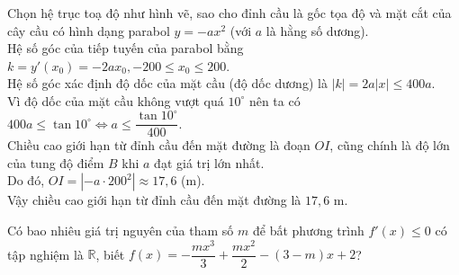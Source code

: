 \begin{bt}
{Chọn hệ trục toạ độ như hình vẽ, sao cho đỉnh cầu là gốc tọa độ và mặt cắt của cây cầu có hình dạng parabol $y=-a x^2$ (với $a$ là hằng số dương).\\
Hệ số góc của tiếp tuyến của parabol bằng $k=y'(x_0)=-2 a x_0,-200 \leq x_0 \leq 200$.\\
Hệ số góc xác định độ dốc của mặt cầu (độ dốc dương) là $|k|=2 a|x| \leq 400 a$.\\
Vì độ dốc của mặt cầu không vượt quá $10^\circ$ nên ta có
$400 a \leq \tan 10^\circ \Leftrightarrow a \leq \dfrac{\tan 10^\circ}{400}$.\\
Chiều cao giới hạn từ đỉnh cầu đến mặt đường là đoạn $O I$, cũng chính là độ lớn của tung độ điểm $B$ khi $a$ đạt giá trị lớn nhất.\\
Do đó, $O I=\left|-a \cdot 200^2\right|\approx 17{,}6$ (m).\\
Vậy chiều cao giới hạn từ đỉnh cầu đến mặt đường là $17{,}6$ m.
}
\end{bt}

\begin{ex}%
	Có bao nhiêu giá trị nguyên của tham số $m$ để bất phương trình $f'(x)\leq 0$ có tập nghiệm là $\mathbb{R}$, biết $f(x) =  -\dfrac{mx^3}{3}+\dfrac{mx^2}{2}-(3-m)x+2$?
\end{ex}

